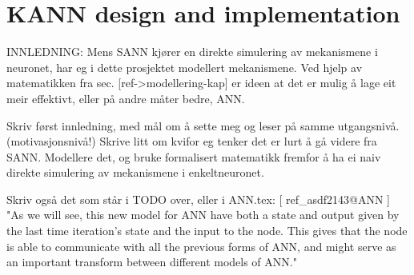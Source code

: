 
%



\section{KANN design and implementation}
\label{secKANN}
	
	INNLEDNING: Mens SANN kjører en direkte simulering av mekanismene i neuronet, har eg i dette prosjektet modellert mekanismene.
	Ved hjelp av matematikken fra sec. [ref->modellering-kap] er ideen at det er mulig å lage eit meir effektivt, eller på andre måter bedre, ANN.

	Skriv først innledning, med mål om å sette meg og leser på samme utgangsnivå. (motivasjonsnivå!)
	Skrive litt om kvifor eg tenker det er lurt å gå videre fra SANN.
	Modellere det, og bruke formalisert matematikk fremfor å ha ei naiv direkte simulering av mekanismene i enkeltneuronet.

	Skriv også det som står i TODO over, eller i ANN.tex: [ ref\_asdf2143@ANN ]%
	"As we will see, this new model for ANN have both a state and output given by the last time iteration's state and the input to the node. 
	This gives that the node is able to communicate with all the previous forms of ANN, and might serve as an important transform between different models of ANN."



